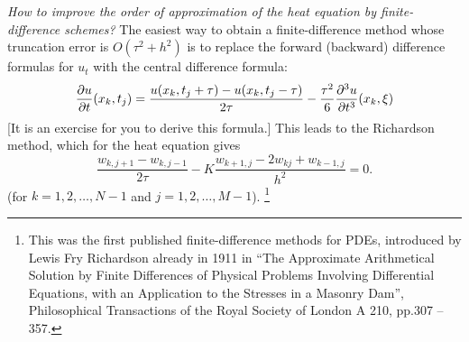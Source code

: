\emph{How to improve the order of approximation
of the heat equation by finite-difference schemes?} The easiest way
to obtain a finite-difference method whose truncation error is
$O(\tau^{2}+h^{2})$ is to replace the forward (backward)
difference formulas for $u_{t}$ with the central difference
formula:
\begin{equation}
\frac{{\partial} u}{{\partial} t}(x_k,t_j)=\frac{u(x_k,t_j+\tau)-u(x_k,t_j-\tau)}{2\tau}-
\frac{\tau^2}{6}\frac{{\partial}^3 u}{{\partial} t^3}(x_k,\xi) \label{aa15}
\end{equation}
[It is an exercise for you to derive this formula.]
This leads to the Richardson method, which for the heat equation gives
\begin{equation}
\frac{w_{k,j+1}-w_{k,j-1}}{2\tau}-K \frac{w_{k+1,
j}-2w_{kj}+w_{k-1,j}}{h^{2}}=0. \label{d4}
\end{equation}
(for $k=1, 2, \dots, N-1$ and $j=1, 2, \dots, M-1$). 
\footnote{This was the first published finite-difference methods for PDEs, introduced by Lewis Fry Richardson already in 1911 in
``The Approximate Arithmetical Solution by Finite Differences of Physical Problems Involving Differential Equations, with an Application to the Stresses in a Masonry Dam'', Philosophical Transactions of the Royal Society of London A 210, pp.307 -- 357.}



